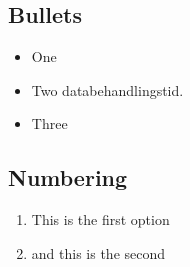 \subsection{Bullets}

\begin{itemize}
	\item	One
	\item	Two databehandlingstid.
	\item	Three
\end{itemize}




\subsection{Numbering}

\begin{enumerate}
	\item This is the first option
	\item and this is the second
\end{enumerate}
